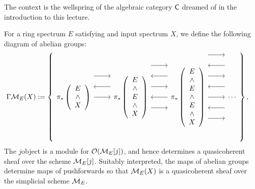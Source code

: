 The context is the wellspring of the algebraic category $\mathsf{C}$ dreamed of in the introduction to this lecture.

\begin{definition}\label{DefnHomologyFunctorsValuedInSheaves}
For a ring spectrum $E$ satisfying {\CH} and input spectrum $X$, we define the following diagram of abelian groups:
\begin{align*}
\Gamma \context{E}(X) & := \left\{
\begin{tikzcd}[ampersand replacement=\&]
\pi_* \left( \begin{array}{c} E \\ \sm \\ X \end{array} \right) \arrow[leftarrow, shift left=\baselineskip]{r} \arrow[shift left=(2*\baselineskip)]{r} \arrow{r} \&
\pi_* \left( \begin{array}{c} E \\ \sm \\ E \\ \sm \\ X \end{array} \right) \arrow[shift left=(3*\baselineskip)]{r} \arrow[leftarrow, shift left=(2*\baselineskip)]{r} \arrow[shift left=\baselineskip]{r} \arrow[leftarrow]{r} \arrow[shift right=\baselineskip]{r} \&
\pi_* \left( \begin{array}{c} E \\ \sm \\ E \\ \sm \\ E \\ \sm \\ X \end{array} \right) \arrow[shift left=(4*\baselineskip)]{r} \arrow[leftarrow, shift left=(3*\baselineskip)]{r} \arrow[shift left=(2*\baselineskip)]{r} \arrow[leftarrow, shift left=\baselineskip]{r} \arrow{r} \arrow[leftarrow, shift right=\baselineskip]{r} \arrow[shift right=(2*\baselineskip)]{r} \&
\cdots
\end{tikzcd}
\right\},
\end{align*}
The $j$\th object is a module for $\mathcal{O}(\mathcal{M}_{E}[j])$, and hence determines a quasicoherent sheaf over the scheme $\mathcal{M}_{E}[j]$.  Suitably interpreted, the maps of abelian groups determine maps of pushforwards so that $\mathcal{M}_{E}(X)$ is a quasicoherent sheaf over the simplicial scheme $\mathcal{M}_{E}$.
\end{definition}

